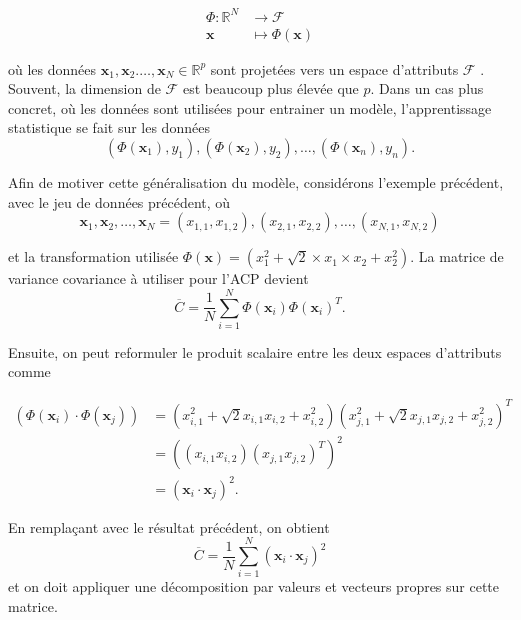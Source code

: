 \begin{align}\label{eq:featurespace}
\Phi : \mathbb{R}^N &\to \mathcal{F} \nonumber \\
\textbf{x} &\mapsto \Phi(\textbf{x}) 
\end{align}

où les données $\textbf{x}_1, \textbf{x}_2. \dots, \textbf{x}_N \in \mathbb{R}^p$ sont projetées vers un espace d'attributs $\mathcal{F}$ \cite{muller2001introduction}. Souvent, la dimension de $\mathcal{F}$ est beaucoup plus élevée que $p$. Dans un cas plus concret, où les données sont utilisées pour entrainer un modèle, l'apprentissage statistique se fait sur les données $$(\Phi(\textbf{x}_1), y_1), (\Phi(\textbf{x}_2), y_2), \dots, (\Phi(\textbf{x}_n), y_n).$$

Afin de motiver cette généralisation du modèle, considérons l'exemple précédent, avec le jeu de données précédent, où
$$\textbf{x}_1, \textbf{x}_2, \dots, \textbf{x}_N = (x_{1,1},x_{1,2}), (x_{2,1}, x_{2,2}), …, (x_{N,1}, x_{N,2})$$

et la transformation utilisée $\Phi(\textbf{x})= (x_1^2 + \sqrt{2} \times x_1\times x_2 + x_2^2)$. La matrice de variance covariance à utiliser pour l’ACP devient
$$\overline{C} = \frac{1}{N} \sum_{i = 1}^{N}   \Phi(\textbf{x}_i) \Phi(\textbf{x}_i)^{T}.$$

Ensuite, on peut reformuler le produit scalaire entre les deux espaces d'attributs comme

\begin{align*}
(\Phi(\textbf{x}_i) \cdot \Phi(\textbf{x}_j)) &= (x_{i, 1}^2 + \sqrt{2} x_{i, 1} x_{i, 2} + x_{i, 2}^2)(x_{j, 1}^2 + \sqrt{2} x_{j, 1} x_{j, 2} + x_{j, 2}^2)^T\\
&= ((x_{i, 1}x_{i, 2})(x_{j, 1}x_{j, 2})^T)^2\\
&= (\textbf{x}_i \cdot \textbf{x}_j)^2.
\end{align*}

En remplaçant avec le résultat précédent, on obtient
$$\overline{C} = \frac{1}{N} \sum_{i = 1}^{N} (\textbf{x}_i \cdot \textbf{x}_j)^2$$ et on doit appliquer une décomposition par valeurs et vecteurs propres sur cette matrice.